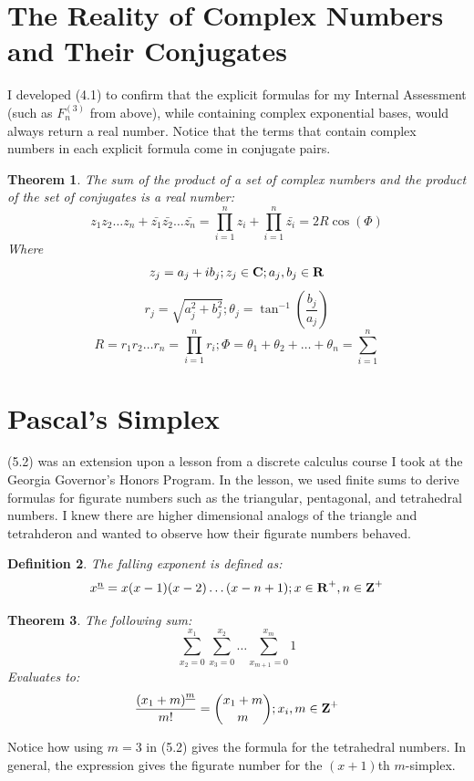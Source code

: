 \documentclass{article}
\newtheorem{theorem}{Theorem}[section]
\newtheorem{definition}[theorem]{Definition}
\begin{document}
\section{The Reality of Complex Numbers and Their Conjugates}

I developed (4.1) to confirm that the explicit formulas for my Internal Assessment (such as $F^{(3)}_n$ from above), while containing complex exponential bases, would always return a real number. Notice that the terms that contain complex numbers in each explicit formula come in conjugate pairs.

\begin{theorem}
    The sum of the product of a set of complex numbers and the product of the set of conjugates is a real number:
    $$z_1z_2\dots z_n+\bar{z_1}\bar{z_2}\dots\bar{z_n}=\prod_{i=1}^n z_i+\prod_{i=1}^n \bar{z_i}=2R\cos{(\Phi)}$$
    Where
    $$z_j=a_j+ib_j;z_j\in\mbox{\textbf{C}};a_j,b_j\in\mbox{\textbf{R}}$$
    $$r_j=\sqrt{a_j^2+b_j^2};\theta_j=\tan^{-1}{\left(\frac{b_j}{a_j}\right)}$$
    $$R=r_1r_2\dots r_n=\prod_{i=1}^n r_i;\Phi=\theta_1+\theta_2+\dots+\theta_n=\sum_{i=1}^n$$
\end{theorem}

\section{Pascal's Simplex}

(5.2) was an extension upon a lesson from a discrete calculus course I took at the Georgia Governor's Honors Program. In the lesson, we used finite sums to derive formulas for figurate numbers such as the triangular, pentagonal, and tetrahedral numbers. I knew there are higher dimensional analogs of the triangle and tetrahderon and wanted to observe how their figurate numbers behaved.

\begin{definition}
    The falling exponent is defined as:
    \[x^{\underline{n}}=x(x-1)(x-2)\dots(x-n+1);x\in\mbox{\textbf{R}}^+,n\in\mbox{\textbf{Z}}^+\]
\end{definition}

\begin{theorem}
    The following sum:
    $$\sum_{x_2 = 0}^{x_1}\sum_{x_3 = 0}^{x_2}\dots\sum_{x_{m+1} = 0}^{x_m}1$$
    Evaluates to:
    $$\frac{{(x_1+m)}^{\underline{m}}}{m!}={{x_1+m} \choose {m}};x_i,m\in\mbox{\textbf{Z}}^+$$
\end{theorem}

Notice how using $m=3$ in (5.2) gives the formula for the tetrahedral numbers. In general, the expression gives the figurate number for the $(x+1)$th $m$-simplex.
\end{document}
